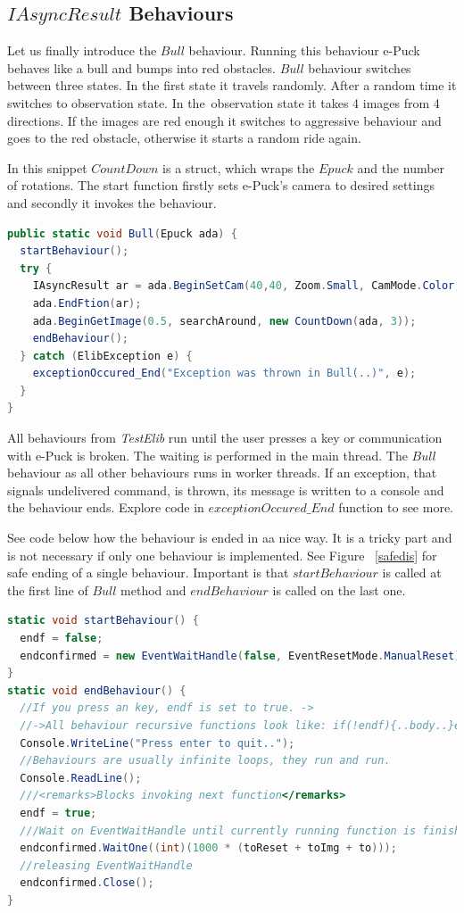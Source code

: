 \subsection{$IAsyncResult$ Behaviours}\label{sec:bull}
  Let us finally introduce the $Bull$ behaviour.
  Running this behaviour e-Puck behaves like a bull and bumps into red obstacles.
  $Bull$ behaviour switches between three states. In the first state it travels randomly. 
  After a random time it switches to observation state.
  In the~observation state it takes 4 images from 4 directions. If the images are red enough 
  it switches to aggressive behaviour and goes to the red obstacle,
  otherwise it starts a random ride again.

  In this snippet $CountDown$ is a struct, which wraps the $Epuck$ and the number of rotations.
  The start function firstly sets e-Puck's camera to desired settings and secondly it invokes the behaviour.

\begin{lstlisting}[language=cs]
public static void Bull(Epuck ada) {
  startBehaviour();
  try {
    IAsyncResult ar = ada.BeginSetCam(40,40, Zoom.Small, CamMode.Color, toSetCam, null, null);
    ada.EndFtion(ar);
    ada.BeginGetImage(0.5, searchAround, new CountDown(ada, 3));
    endBehaviour();
  } catch (ElibException e) {
    exceptionOccured_End("Exception was thrown in Bull(..)", e);
  }
}
\end{lstlisting}
  
  All behaviours from {\it TestElib} run until the user presses a key or communication with e-Puck is broken. 
  The waiting is performed in the main thread. 
  The $Bull$ behaviour as all other behaviours runs in worker threads.
  If an exception, that signals undelivered command, is thrown, 
  its message is written to a console and the behaviour ends. 
  Explore code in $exceptionOccured\_End$ function to see more.

  See code below how the behaviour is ended in aa  nice way. 
  It is a tricky part and is not necessary if only one behaviour is implemented. See Figure ~\ref{safedis}
  for safe ending of a single behaviour.
  Important is that $startBehaviour$ is called at the first line of $Bull$ method 
  and $endBehaviour$ is called on the last one.
\begin{lstlisting}[language=cs]
static void startBehaviour() {
  endf = false;
  endconfirmed = new EventWaitHandle(false, EventResetMode.ManualReset);
}
static void endBehaviour() {        
  //If you press an key, endf is set to true. ->
  //->All behaviour recursive functions look like: if(!endf){..body..}else endconfirmed.Set();
  Console.WriteLine("Press enter to quit..");
  //Behaviours are usually infinite loops, they run and run.
  Console.ReadLine();
  ///<remarks>Blocks invoking next function</remarks>
  endf = true;
  ///Wait on EventWaitHandle until currently running function is finished.
  endconfirmed.WaitOne((int)(1000 * (toReset + toImg + to)));
  //releasing EventWaitHandle
  endconfirmed.Close();
}
\end{lstlisting}

